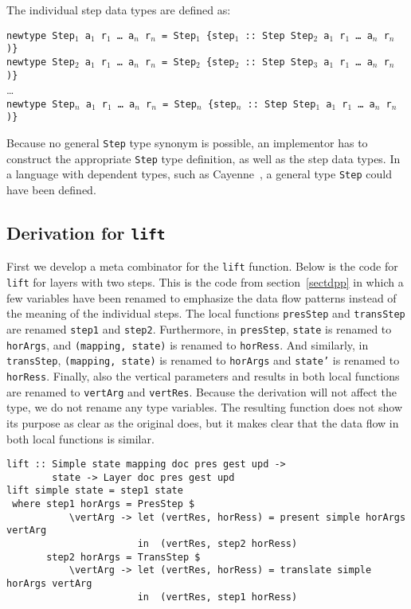 The individual step data types are defined as:

{\tt newtype Step$_1$ a$_1$ r$_1$ \dots ~a$_n$ r$_n$ = Step$_1$ \{step$_1$}\verb| :: |{\tt Step Step$_2$ a$_1$ r$_1$ \dots ~a$_n$ r$_n$ )\}}\\
{\tt newtype Step$_2$ a$_1$ r$_1$ \dots ~a$_n$ r$_n$ = Step$_2$ \{step$_2$}\verb| :: |{\tt Step Step$_3$ a$_1$ r$_1$ \dots ~a$_n$ r$_n$ )\}}\\
\dots\\
{\tt newtype Step$_n$ a$_1$ r$_1$ \dots ~a$_n$ r$_n$ = Step$_n$ \{step$_n$}\verb| :: |{\tt Step Step$_1$ a$_1$ r$_1$ \dots ~a$_n$ r$_n$ )\}}

Because no general \texttt{Step} type synonym is possible, an implementor has to construct the appropriate \texttt{Step} type definition, as well as the step data types. In a language with dependent types, such as Cayenne~\cite{cayenne}, a general type \texttt{Step} could have been defined.


\subsection{Derivation for \texttt{lift}}

First we develop a meta combinator for the \texttt{lift} function. Below is the code for \texttt{lift} for layers with two steps. This is the code from section~\ref{sectdpp} in which a few variables have been renamed to emphasize the data flow patterns instead of the meaning of the individual steps. The local functions \texttt{presStep} and \texttt{transStep} are renamed \texttt{step1} and \texttt{step2}. Furthermore, in \texttt{presStep}, \texttt{state} is renamed to \texttt{horArgs}, and \texttt{(mapping, state)} is renamed to \texttt{horRess}. And similarly, in \texttt{transStep}, \texttt{(mapping, state)} is renamed to \texttt{horArgs} and \texttt{state'} is renamed to \texttt{horRess}. Finally, also the vertical parameters and results in both local functions are renamed to \texttt{vertArg} and \texttt{vertRes}. Because the derivation will not affect the type, we do not rename any type variables. The resulting function does not show its purpose as clear as the original does, but it makes clear that the data flow in both local functions is similar.

\begin{small}
\begin{verbatim}
lift :: Simple state mapping doc pres gest upd ->
        state -> Layer doc pres gest upd
lift simple state = step1 state 
 where step1 horArgs = PresStep $ 
           \vertArg -> let (vertRes, horRess) = present simple horArgs vertArg                                         
                       in  (vertRes, step2 horRess)
       step2 horArgs = TransStep $
           \vertArg -> let (vertRes, horRess) = translate simple horArgs vertArg                     
                       in  (vertRes, step1 horRess)
\end{verbatim}
\end{small}

